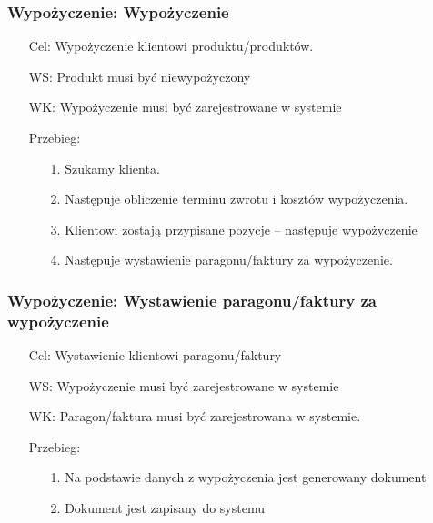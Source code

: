 \documentclass{article}
\begin{document}
\subsubsection{Wypożyczenie: Wypożyczenie}
\begin{enumerate}
	\item[Cel:] Wypożyczenie klientowi produktu/produktów. 
	\item[WS:] Produkt musi być niewypożyczony 
	\item[WK:] Wypożyczenie musi być zarejestrowane w systemie
	\item[Przebieg:]
	\begin{enumerate}
		\item [1.]Szukamy klienta.
		\item [2.]Następuje obliczenie terminu zwrotu i kosztów wypożyczenia.
		\item [3.]Klientowi zostają przypisane pozycje – następuje wypożyczenie
		\item [4.]Następuje wystawienie paragonu/faktury za wypożyczenie.
	\end{enumerate}
\end{enumerate}

\subsubsection{Wypożyczenie: Wystawienie paragonu/faktury za wypożyczenie}
\begin{enumerate}
	\item[Cel:] Wystawienie klientowi paragonu/faktury
	\item[WS:] Wypożyczenie musi być zarejestrowane w systemie
	\item[WK:]  Paragon/faktura musi być zarejestrowana w systemie.
	\item[Przebieg:]
	\begin{enumerate}
		\item [1.]Na podstawie danych z wypożyczenia jest generowany dokument
		\item [2.]Dokument jest zapisany do systemu
	\end{enumerate}
\end{enumerate}
\end{document}
